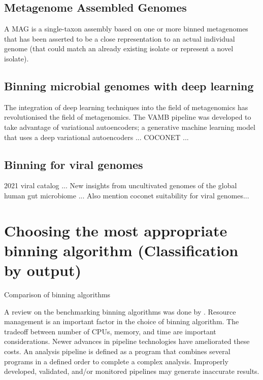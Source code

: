 \documentclass{article}
\begin{document}
\subsection*{Metagenome Assembled Genomes}
A \gls{MAG} is a single-taxon assembly based on one or more binned metagenomes that has been asserted to be a close representation to an actual individual genome (that could match an already existing isolate or represent a novel isolate).

\subsection*{Binning microbial genomes with deep learning}
The integration of deep learning techniques into the field of metagenomics has revolutionised the field of metagenomics.
The \gls{VAMB} pipeline was developed to take advantage of variational autoencoders; a generative machine learning model that uses a deep variational autoencoders \cite{nissenimproved}...
COCONET \cite{arisdakessian2021coconet}...

\subsection*{Binning for viral genomes}
2021 viral catalog \cite{nayfach2021metagenomic}...
New insights from uncultivated genomes of the global human gut microbiome \cite{nayfach2019new}...
Also mention coconet suitability for viral genomes...

\section*{Choosing the most appropriate binning algorithm (Classification by output)}
\begin{sidewaystable}
\begin{tiny}
\centering
\caption[Comparison of binning algorithms]{Comparison of binning algorithms}
	
\label{Tbinningsoftware}
\end{tiny}
\end{sidewaystable}
A review on the benchmarking binning algorithms was done by .
Resource management is an important factor in the choice of binning algorithm.
The tradeoff between number of \glspl{CPU}, memory, and time are important considerations.
Newer advances in pipeline technologies have ameliorated these costs.
An analysis pipeline is defined as a program that combines several programs in a defined order to complete a complex analysis.
Improperly developed, validated, and/or monitored pipelines may generate inaccurate results.
\end{document}
